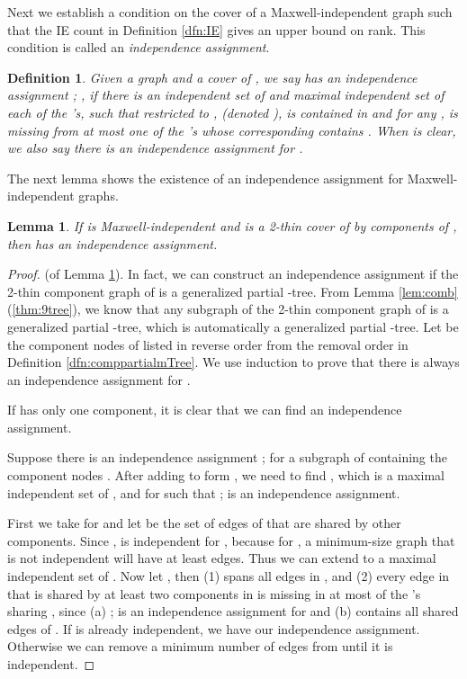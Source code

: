 \documentclass[10pt]{article}
\newtheorem{lem}{Lemma}
\newtheorem{dfn}{Definition}
\begin{document}
Next we establish a condition on the cover of a Maxwell-independent graph such that the IE count in Definition \ref{dfn:IE} gives an upper bound on rank. This condition is called an {\em independence assignment}.

\begin{dfn}\label{dfn:assign}
Given a graph  and a cover  of , we say  has an {\em independence assignment} ; , if there is an independent set  of  and maximal independent set
 of each of the 's, such that  {\em restricted to} , (denoted ), is contained in  and for any , 
is missing from at most one of the 's whose corresponding  contains . When  is clear, we also say there is an independence assignment for . \end{dfn}


\medskip
\noindent
The next lemma shows the existence of an independence assignment for Maxwell-independent graphs.

\begin{lem}\label{lem:assign}
If  is Maxwell-independent and  is a 2-thin cover of  by components of , then  has an independence assignment.
\end{lem}
\begin{proof} (of Lemma \ref{lem:assign}).
In fact, we can construct an independence assignment if the 2-thin component graph of  is a generalized partial -tree.
From Lemma \ref{lem:comb}(\ref{thm:9tree}), we know that any subgraph of the 2-thin component graph  of  is a generalized partial
-tree, which is automatically a generalized partial -tree. Let   be the component nodes of  listed in reverse order from the removal order in Definition \ref{dfn:comppartialmTree}. We use induction to prove that there is always an independence assignment for .

If  has only one component, it is clear that we can find an independence assignment.

Suppose there is an independence assignment ;   for a subgraph  of  containing the component nodes . After adding  to form , we need to find , which is a maximal independent set of , and  for  such that ;   is an independence assignment.

First we take  for  and let  be the set of edges of  that are shared by other components. Since ,  is independent for , because for , a minimum-size graph that is not independent will have at least  edges. Thus we can extend  to a maximal independent set  of . Now let    , then (1)  spans all edges in , and (2) every edge  in  that is shared by at least two components in   is missing in at most  of the 's sharing , since (a) ;   is an independence assignment for  and (b)  contains all shared edges of . If  is already independent, we have our independence assignment. Otherwise we can remove a minimum number of edges from  until it is independent.

\end{proof}
\end{document}
